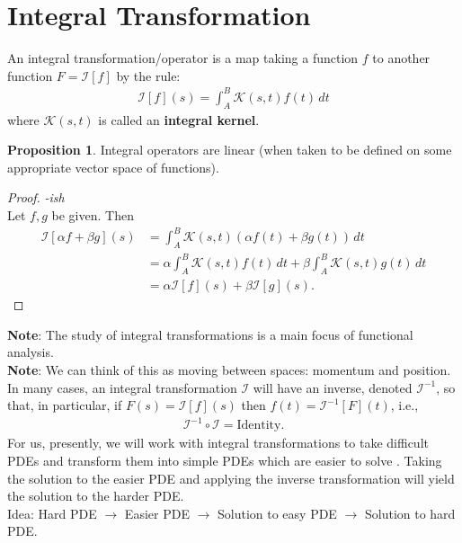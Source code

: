 \documentclass{article}
\theoremstyle{definition}
\newtheorem{prop}{Proposition}[section]
\newcommand{\I}{\mathcal{I}}
\newcommand{\K}{\mathcal{K}}
\begin{document}
\newpage


\section{Integral Transformation}
An integral transformation/operator is a map taking a function $f$ to another function $F = \I[f]$ by the rule:
\begin{align*}
\boxed{\I[f](s) = \int^B_A \K(s,t)f(t)\,dt}
\end{align*}
where $\K(s,t)$ is called an \textbf{integral kernel}.\\

\begin{prop}
	Integral operators are linear (when taken to be defined on some appropriate vector space of functions). 
	\begin{proof}\textit{-ish}\\
		
		Let $f,g$ be given. Then
		\begin{align*}
		\I[\alpha f+ \beta g](s) &= \int^B_A \K(s,t)\left(\alpha f(t) + \beta g(t)\right)\,dt\\
		&= \alpha \int^B_A \K(s,t)f(t)\,dt + \beta \int^B_A \K(s,t)g(t)\,dt\\
		&= \alpha\I[f](s) + \beta\I[g](s).
		\end{align*}
	\end{proof}
\end{prop}

\textbf{Note}: The study of integral transformations is a main focus of functional analysis. \\

\textbf{Note}: We can think of this as moving between spaces: momentum and position. \\

In many cases, an integral transformation $\I$ will have an inverse, denoted $\I^{-1}$, so that, in particular, if $F(s) = \I[f](s)$ then $f(t) = \I^{-1}[F](t)$, i.e.,
\begin{align*}
\I^{-1}\circ \I = \text{Identity}.
\end{align*}
For us, presently, we will work with integral transformations to take difficult PDEs and transform them into simple PDEs which are easier to solve . Taking the solution to the easier PDE and applying the inverse transformation will yield the solution to the harder PDE.\\

Idea: Hard PDE $\to$ Easier PDE $\to$ Solution to easy PDE $\to$ Solution to hard PDE.\\
\end{document}
